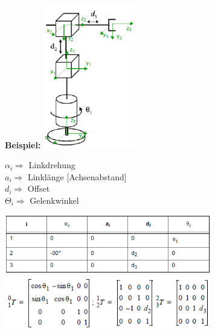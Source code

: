 \begin{minipage}{3cm}
\textbf{Beispiel:}
\includegraphics[width=4cm]{./bilder/denavit_grafik.png} \\
\end{minipage}
\begin{minipage}{6cm}
$\alpha_{i} \Longrightarrow $ Linkdrehung  \\
$ a_{i} \Longrightarrow $ Linklänge [Achsenabstand] \\
$ d_{i} \Longrightarrow $ Offset \\
$ \Theta_{i} \Longrightarrow $ Gelenkwinkel \\ 
\end{minipage}
\begin{minipage}{8cm}
\includegraphics[width=9cm]{./bilder/denavit_tabelle.png} \\
\includegraphics[width=9cm]{./bilder/denavit_matrix.png} \\
\end{minipage} \\
